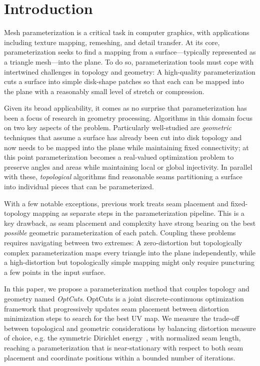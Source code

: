 
\section{Introduction}
Mesh parameterization is a critical task in computer graphics, with applications including texture mapping, remeshing, and detail transfer.  At its core, parameterization seeks to find a mapping from a surface---typically represented as a triangle mesh---into the plane.  To do so, parameterization tools must cope with intertwined challenges in topology and geometry:  A high-quality parameterization cuts a surface into simple disk-shape patches so that each can be mapped into the plane with a reasonably small level of stretch or compression.

Given its broad applicability, it comes as no surprise that parameterization has been a focus of research in geometry processing.  Algorithms in this domain focus on two key aspects of the problem.  Particularly well-studied are \emph{geometric} techniques that assume a surface has already been cut into disk topology and now needs to be mapped into the plane while maintaining fixed connectivity; at this point parameterization becomes a real-valued optimization problem to preserve angles and areas while maintaining local or global injectivity. In parallel with these, \emph{topological} algorithms find reasonable seams partitioning a surface into individual pieces that can be parameterized.  

With a few notable exceptions, previous work treats seam placement and fixed-topology mapping as separate steps in the parameterization pipeline.  This is a key drawback, as seam placement and complexity have strong bearing on the best \emph{possible} geometric parameterization of each patch.  Coupling these problems requires navigating between two extremes:  A zero-distortion but topologically complex parameterization maps every triangle into the plane independently, while a high-distortion but topologically simple mapping might only require puncturing a few points in the input surface.

In this paper, we propose a parameterization method that couples topology and geometry named 
{\em OptCuts}.
OptCuts is 
a joint discrete-continuous optimization framework that progressively updates seam placement between distortion minimization steps to search for the best UV map. 
%
We measure the trade-off between topological and geometric considerations by balancing distortion measure of choice, e.g. the symmetric Dirichlet energy~\cite{Smith2015Bijective}, with normalized seam length, reaching a parameterization that is near-stationary with respect to both seam placement and coordinate positions within a bounded number of iterations.

